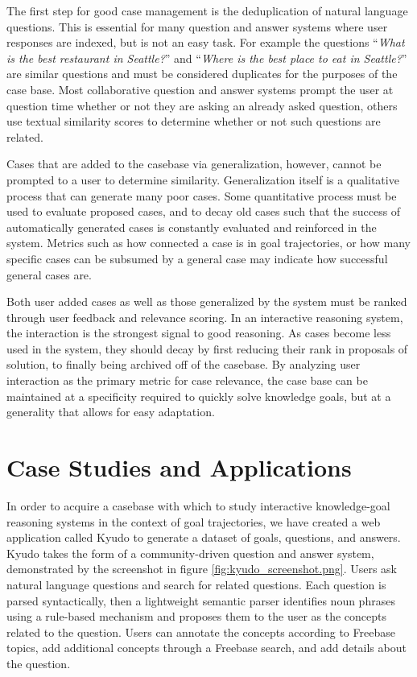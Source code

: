 \documentclass[11pt,letterpaper]{article}
\begin{document}
The first step for good case management is the deduplication of natural language questions. This is essential for many question and answer systems where user responses are indexed, but is not an easy task. For example the questions ``\textit{What is the best restaurant in Seattle?}'' and ``\textit{Where is the best place to eat in Seattle?}'' are similar questions and must be considered duplicates for the purposes of the case base. Most collaborative question and answer systems prompt the user at question time whether or not they are asking an already asked question, others use textual similarity scores to determine whether or not such questions are related.

Cases that are added to the casebase via generalization, however, cannot be prompted to a user to determine similarity. Generalization itself is a qualitative process that can generate many poor cases. Some quantitative process must be used to evaluate proposed cases, and to decay old cases such that the success of automatically generated cases is constantly evaluated and reinforced in the system. Metrics such as how connected a case is in goal trajectories, or how many specific cases can be subsumed by a general case may indicate how successful general cases are.

Both user added cases as well as those generalized by the system must be ranked through user feedback and relevance scoring. In an interactive reasoning system, the interaction is the strongest signal to good reasoning. As cases become less used in the system, they should decay by first reducing their rank in proposals of solution, to finally being archived off of the casebase. By analyzing user interaction as the primary metric for case relevance, the case base can be maintained at a specificity required to quickly solve knowledge goals, but at a generality that allows for easy adaptation.

\section{Case Studies and Applications}

In order to acquire a casebase with which to study interactive knowledge-goal reasoning systems in the context of goal trajectories, we have created a web application called Kyudo to generate a dataset of goals, questions, and answers. Kyudo takes the form of a community-driven question and answer system, demonstrated by the screenshot in figure \ref{fig:kyudo_screenshot.png}. Users ask natural language questions and search for related questions. Each question is parsed syntactically, then a lightweight semantic parser identifies noun phrases using a rule-based mechanism and proposes them to the user as the concepts related to the question. Users can annotate the concepts according to Freebase topics, add additional concepts through a Freebase search, and add details about the question.
\end{document}
